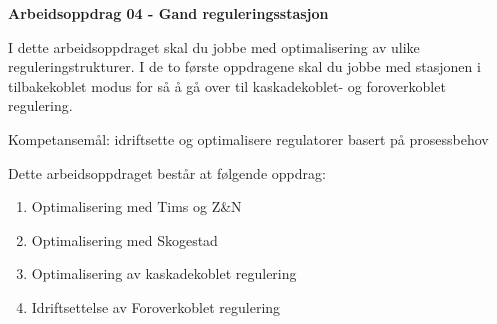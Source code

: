 
\noindent
{\bf Arbeidsoppdrag 04 - Gand reguleringsstasjon}

I dette arbeidsoppdraget skal du jobbe med optimalisering av ulike reguleringstrukturer. I de to første oppdragene skal du jobbe med stasjonen i tilbakekoblet modus for så å gå over til kaskadekoblet- og foroverkoblet regulering. 

\vskip 5pt
Kompetansemål:
idriftsette og optimalisere regulatorer basert på prosessbehov

Dette arbeidsoppdraget består at følgende oppdrag:
\begin{enumerate}
	\item Optimalisering med Tims og Z\&N 
	\item Optimalisering med Skogestad
	\item Optimalisering av kaskadekoblet regulering
	\item Idriftsettelse av Foroverkoblet regulering
\end{enumerate}



